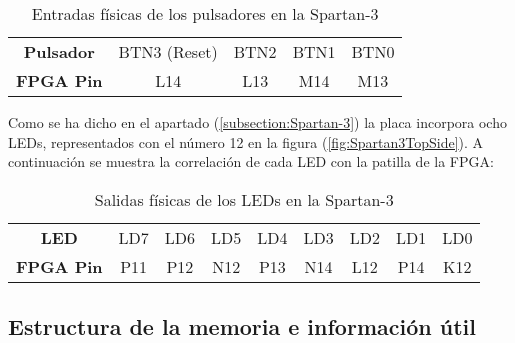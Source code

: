     \begin{table}[H]
            \centering
            \begin{tabular}{|c|c|c|c|c|}
                \hline
                \rowcolor[rgb]{0.21,0.69,0.87}\multicolumn{5}{|c|}{  \textbf{ {Entradas Pulsadores}}} \\
                \hline \hline
                \textbf{  Pulsador  } & BTN3 (Reset) & BTN2 & BTN1 & BTN0  \\
                \hline
                \textbf{  FPGA Pin  } & L14 & L13 & M14 & M13  \\
                \hline
                 
            \end{tabular}
        \caption{ Entradas físicas de los pulsadores en la Spartan-3 }
        \label{tab:tablaEntradasPulsadores}
    \end{table}

    Como se ha dicho en el apartado (\ref{subsection:Spartan-3}) la placa incorpora ocho LEDs, representados con el número 12 en la figura (\ref{fig:Spartan3TopSide}). A continuación se muestra la correlación de cada LED con la patilla de la FPGA:

   \begin{table}[H]
            \centering
            \begin{tabular}{|c|c|c|c|c|c|c|c|c|}
                \hline
                \rowcolor[rgb]{0.21,0.69,0.87}\multicolumn{9}{|c|}{  \textbf{ {Salidas LED}}} \\
                \hline \hline
                \textbf{  LED  } & LD7 & LD6 & LD5 & LD4 & LD3 & LD2 & LD1 & LD0 \\
                \hline
                \textbf{  FPGA Pin  } & P11 & P12 & N12 & P13 & N14 & L12 & P14 & K12  \\
                \hline
                 
            \end{tabular}
        \caption{ Salidas físicas de los LEDs en la Spartan-3 }
        \label{tab:tablaSalidasLED}
    \end{table}

\subsection{Estructura de la memoria e información útil}

